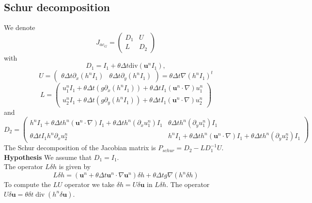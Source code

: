 \documentclass[a4paper, 11pt]{article}
\begin{document}
\subsection{Schur decomposition}

We denote 
\begin{equation*}
J_{ac_G}=\begin{pmatrix}D_1&U\\L&D_2\end{pmatrix}
\end{equation*}
with
\begin{equation*}
D_1=I_1+\theta\Delta t\text{div}(\boldsymbol{u}^nI_1),
\end{equation*}
\begin{equation*}
U=\begin{pmatrix}\theta\Delta t\partial_x\left(h^nI_1\right)&\theta\Delta t\partial_y\left(h^nI_1\right)\end{pmatrix}=\theta\Delta t\nabla\left(h^nI_1\right)^t
\end{equation*}
\begin{equation*}
L=\begin{pmatrix}
u_1^nI_1+\theta\Delta t (g \partial_x (h^n I_1) )+\theta\Delta tI_1\left(\boldsymbol{u}^n\cdot\nabla\right)u_1^n\\
u_2^nI_1+\theta\Delta t (g \partial_y (h^n I_1) )+\theta\Delta tI_1\left(\boldsymbol{u}^n\cdot\nabla\right)u_2^n
\end{pmatrix}
\end{equation*}
and
\begin{equation*}
D_2=\begin{pmatrix}h^nI_1+\theta\Delta th^n\left(\boldsymbol{u}^n\cdot \nabla\right)I_1+\theta\Delta th^n(\partial_xu_1^n)I_1&\theta\Delta th^n(\partial_yu_1^n)I_1\\
\theta\Delta tI_1h^n\partial_xu_2^n&h^nI_1+\theta\Delta th^n\left(\boldsymbol{u}^n\cdot\nabla\right)I_1+\theta\Delta th^n(\partial_yu_2^n)I_1
\end{pmatrix}
\end{equation*}
The Schur decomposition of the Jacobian matrix is $P_{schur}=D_2-LD_1^{-1}U$.\\
\textbf{Hypothesis} We assume that $D_1=I_1$.\\

The operator $L \delta h$ is given by
$$
L \delta h =(\boldsymbol{u}^n+\theta \Delta t \boldsymbol{u}^n\cdot \nabla \boldsymbol{u}^n )\delta h+\theta \Delta t g \nabla( h^n\delta h)
$$
To compute the $LU$ operator we take $\delta h=U\delta \boldsymbol{u}$ in $L \delta h$. The operator $U\delta \boldsymbol{u}=\theta \delta t \operatorname{div}(h^n \delta \boldsymbol{u})$.
\end{document}
